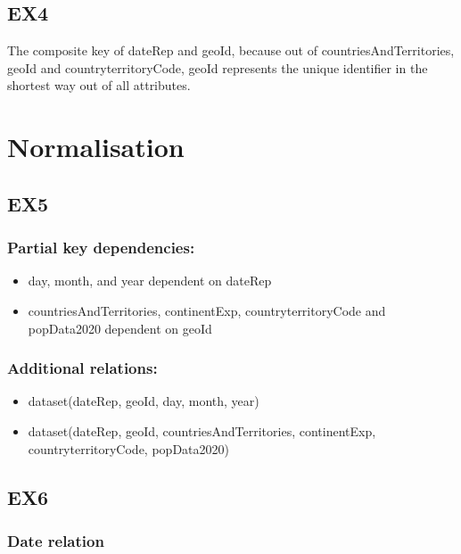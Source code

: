 \documentclass{article}
\begin{document}
\subsection{EX4}

The composite key of dateRep and geoId, because out of countriesAndTerritories, geoId and countryterritoryCode, geoId represents the unique identifier in the shortest way out of all attributes.

\section{Normalisation}

\subsection{EX5}

\subsubsection{Partial key dependencies:}

\begin{itemize}
    \item day, month, and year dependent on dateRep
    
    \item countriesAndTerritories, continentExp, countryterritoryCode and popData2020 dependent on geoId
\end{itemize}

\subsubsection{Additional relations:}

\begin{itemize}
    \item dataset(dateRep, geoId, day, month, year)

    \item dataset(dateRep, geoId, countriesAndTerritories, continentExp, countryterritoryCode, popData2020)
\end{itemize}

\subsection{EX6}

\subsubsection{Date relation}
\end{document}
